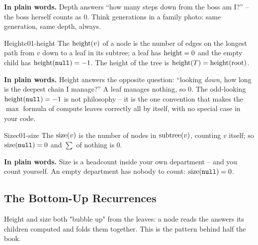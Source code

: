 \noindent\textbf{In plain words.} Depth answers ``how many steps down from the boss am
I?'' -- the boss herself counts as $0$. Think generations in a family photo: same
generation, same depth, always.

\begin{definition}{Height}{c01-height}
The  $\operatorname{height}(v)$ of a node is the number of edges on the longest path from
$v$ down to a leaf in its subtree; a leaf has $\operatorname{height}=0$ and the empty child has
$\operatorname{height}(\texttt{null})=-1$. The height of the tree is $\operatorname{height}(T)=\operatorname{height}(\text{root})$.
\end{definition}

\noindent\textbf{In plain words.} Height answers the opposite question: ``looking
\emph{down}, how long is the deepest chain I manage?'' A leaf manages nothing, so $0$.
The odd-looking $\operatorname{height}(\texttt{null})=-1$ is not philosophy -- it is the one convention that
makes the $\max$ formula of  compute leaves correctly all by
itself, with no special case in your code.

\begin{definition}{Size}{c01-size}
The  $\operatorname{size}(v)$ is the number of nodes in $\operatorname{subtree}(v)$, counting $v$
itself; so $\operatorname{size}(\texttt{null})=0$ and $\sum$ of nothing is $0$.
\end{definition}

\noindent\textbf{In plain words.} Size is a headcount inside your own department -- and
you count yourself. An empty department has nobody to count: $\operatorname{size}(\texttt{null})=0$.

\subsection{The Bottom-Up Recurrences}

Height and size both "bubble up" from the leaves: a node reads the answers its children
computed and folds them together. This is the pattern behind half the book.

